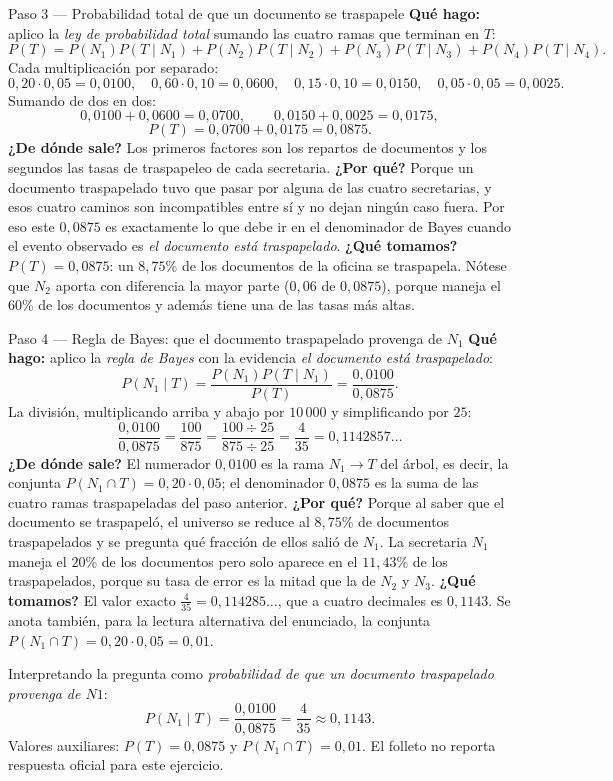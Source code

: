 \documentclass[11pt]{article}
\begin{document}
\begin{sol}
\begin{paso}{Paso 3 --- Probabilidad total de que un documento se traspapele}
\textbf{Qué hago:} aplico la \emph{ley de probabilidad total} sumando las cuatro ramas que terminan en $T$:
\[
P(T)=P(N_1)P(T\mid N_1)+P(N_2)P(T\mid N_2)+P(N_3)P(T\mid N_3)+P(N_4)P(T\mid N_4).
\]
Cada multiplicación por separado:
\[
0,20\cdot 0,05=0,0100,\quad 0,60\cdot 0,10=0,0600,\quad 0,15\cdot 0,10=0,0150,\quad 0,05\cdot 0,05=0,0025 .
\]
Sumando de dos en dos:
\[
0,0100+0,0600=0,0700,\qquad 0,0150+0,0025=0,0175,
\]
\[
P(T)=0,0700+0,0175=0,0875 .
\]
\textbf{¿De dónde sale?} Los primeros factores son los repartos de documentos y los segundos las tasas de traspapeleo de cada secretaria.
\textbf{¿Por qué?} Porque un documento traspapelado tuvo que pasar por alguna de las cuatro secretarias, y esos cuatro caminos son incompatibles entre sí y no dejan ningún caso fuera. Por eso este $0,0875$ es exactamente lo que debe ir en el denominador de Bayes cuando el evento observado es \emph{el documento está traspapelado}.
\textbf{¿Qué tomamos?} $P(T)=0,0875$: un $8,75\%$ de los documentos de la oficina se traspapela. Nótese que $N_2$ aporta con diferencia la mayor parte ($0,06$ de $0,0875$), porque maneja el $60\%$ de los documentos y además tiene una de las tasas más altas.
\end{paso}

\begin{paso}{Paso 4 --- Regla de Bayes: que el documento traspapelado provenga de $N_1$}
\textbf{Qué hago:} aplico la \emph{regla de Bayes} con la evidencia \emph{el documento está traspapelado}:
\[
P(N_1\mid T)=\frac{P(N_1)P(T\mid N_1)}{P(T)}=\frac{0,0100}{0,0875}.
\]
La división, multiplicando arriba y abajo por $10\,000$ y simplificando por $25$:
\[
\frac{0,0100}{0,0875}=\frac{100}{875}=\frac{100\div 25}{875\div 25}=\frac{4}{35}=0,1142857\ldots
\]
\textbf{¿De dónde sale?} El numerador $0,0100$ es la rama $N_1\to T$ del árbol, es decir, la conjunta $P(N_1\cap T)=0,20\cdot 0,05$; el denominador $0,0875$ es la suma de las cuatro ramas traspapeladas del paso anterior.
\textbf{¿Por qué?} Porque al saber que el documento se traspapeló, el universo se reduce al $8,75\%$ de documentos traspapelados y se pregunta qué fracción de ellos salió de $N_1$. La secretaria $N_1$ maneja el $20\%$ de los documentos pero solo aparece en el $11,43\%$ de los traspapelados, porque su tasa de error es la mitad que la de $N_2$ y $N_3$.
\textbf{¿Qué tomamos?} El valor exacto $\tfrac{4}{35}=0,114285\ldots$, que a cuatro decimales es $0,1143$. Se anota también, para la lectura alternativa del enunciado, la conjunta $P(N_1\cap T)=0,20\cdot 0,05=0,01$.
\end{paso}

\begin{resp}
Interpretando la pregunta como \emph{probabilidad de que un documento traspapelado provenga de $N1$}:
\[
P(N_1\mid T)=\frac{0,0100}{0,0875}=\frac{4}{35}\approx 0,1143 .
\]
Valores auxiliares: $P(T)=0,0875$ y $P(N_1\cap T)=0,01$. El folleto no reporta respuesta oficial para este ejercicio.
\end{resp}

\end{sol}
\end{document}
